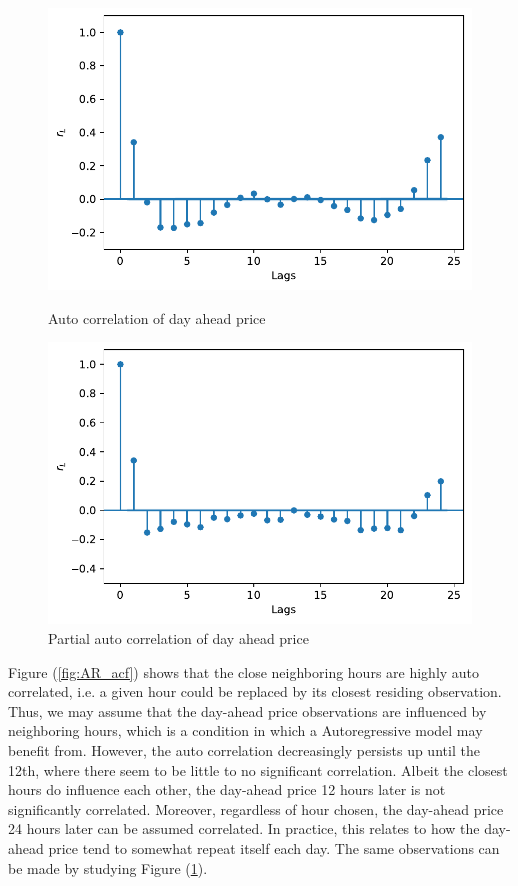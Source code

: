 \documentclass
[twocolumn,
secnumarabic,
nobibnotes,
aps,
prl,
reprint,
groupedaddress,
amsmath,
amssymb,
]{revtex4-2}
\begin{document}
\begin{figure}
  \includegraphics[width=\columnwidth]{figures/AR_acf.pdf}
  \caption{\label{fig:AR_acf} Auto correlation of day ahead price}
  \includegraphics[width=\columnwidth]{figures/AR_pacf.pdf}
  \caption{\label{fig:AR_pacf} Partial auto correlation of day ahead price}
\end{figure}

Figure (\ref{fig:AR_acf}) shows that the close neighboring hours are highly auto correlated, i.e. a given hour could be replaced by its closest residing observation. Thus, we may assume that the day-ahead price observations are influenced by neighboring hours, which is a condition in which a Autoregressive model may benefit from. However, the auto correlation decreasingly persists up until the 12th, where there seem to be little to no significant correlation. Albeit the closest hours do influence each other, the day-ahead price 12 hours later is not significantly correlated. Moreover, regardless of hour chosen, the day-ahead price 24 hours later can be assumed correlated. In practice, this relates to how the day-ahead price tend to somewhat repeat itself each day. The same observations can be made by studying Figure (\ref{fig:AR_pacf}).
\end{document}
